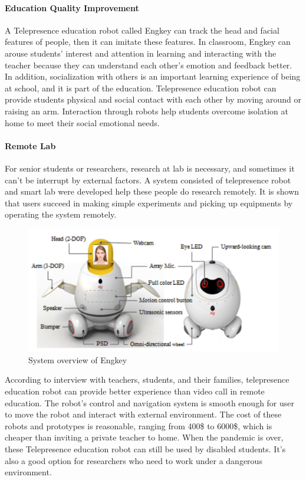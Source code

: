 \documentclass[a4paper]{article}
\begin{document}
\paragraph{Education Quality Improvement}
    A Telepresence education robot called Engkey can track the head and facial features of people, then it can imitate these features\cite{54}. In classroom, Engkey can arouse students' interest and attention in learning and interacting with the teacher because they can understand each other's emotion and feedback better. In addition, socialization with others is an important learning experience of being at school, and it is part of the education\cite{55}. Telepresence education robot can provide students physical and social contact with each other by moving around or raising an arm. Interaction through robots help students overcome isolation at home to meet their social emotional needs\cite{56}.
\paragraph{Remote Lab}
    For senior students or researchers, research at lab is necessary, and sometimes it can't be interrupt by external factors. A system consisted of telepresence robot and smart lab were developed help these people do research remotely\cite{57}. It is shown that users succeed in making simple experiments and picking up equipments by operating the system remotely.
\begin{figure}[H]
    \centering
    \includegraphics[scale=0.25]{Engkey.png}
    \caption{System overview of Engkey}
    \label{Engkey}
\end{figure}
    According to interview with teachers, students, and their families, telepresence education robot can provide better experience than video call in remote education. The robot's control and navigation system is smooth enough for user to move the robot and interact with external environment. The cost of these robots and prototypes is reasonable, ranging from 400\$ to 6000\$, which is cheaper than inviting a private teacher to home. When the pandemic is over, these Telepresence education robot can still be used by disabled students. It's also a good option for researchers who need to work under a dangerous environment.
    
\end{document}
